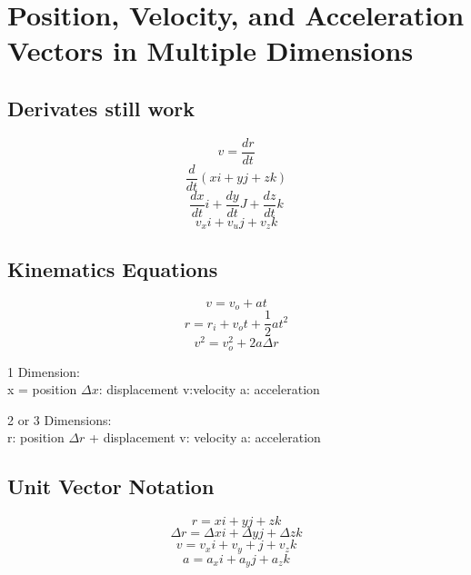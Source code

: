 \section{Position, Velocity, and Acceleration Vectors in Multiple Dimensions}

\subsection{Derivates still work}
\[v=\frac{dr}{dt}\]
\[\frac{d}{dt}(xi+yj+zk)\]
\[\frac{dx}{dt}i + \frac{dy}{dt} J + \frac{dz}{dt} k\]
\[v_x i +v_uj+v_zk\]

\subsection{Kinematics Equations}
\[v=v_o+at\]
\[r=r_i+v_ot+\frac{1}{2}at^2\]
\[v^2=v_o^2+2a\Delta r\]

\begin{center}
1 Dimension: \\
x = position 
$\Delta x$: displacement
v:velocity
a: acceleration
\end{center}

\begin{center} 
2 or 3 Dimensions: \\
r: position 
$\Delta r$ + displacement
v: velocity
a: acceleration 
\end{center}


\subsection{Unit Vector Notation}
\[r=xi+yj+zk\]
\[\Delta r= \Delta xi+\Delta yj+\Delta zk\]
\[v=v_xi+v_y+j+v_zk\]
\[a=a_xi+a_yj+a_zk\]